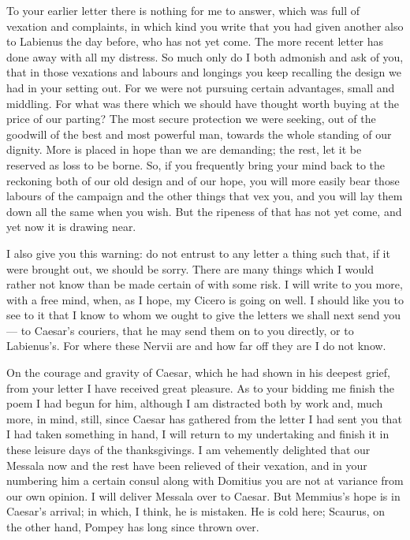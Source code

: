 

 To your earlier letter there is nothing for me to answer, which was full of vexation and complaints, in which kind you write that you had given another also to Labienus the day before, who has not yet come. The more recent letter has done away with all my distress. So much only do I both admonish and ask of you, that in those vexations and labours and longings you keep recalling the design we had in your setting out. For we were not pursuing certain advantages, small and middling. For what was there which we should have thought worth buying at the price of our parting? The most secure protection we were seeking, out of the goodwill of the best and most powerful man, towards the whole standing of our dignity. More is placed in hope than we are demanding; the rest, let it be reserved as loss to be borne. So, if you frequently bring your mind back to the reckoning both of our old design and of our hope, you will more easily bear those labours of the campaign and the other things that vex you, and you will lay them down all the same when you wish. But the ripeness of that has not yet come, and yet now it is drawing near.

 I also give you this warning: do not entrust to any letter a thing such that, if it were brought out, we should be sorry. There are many things which I would rather not know than be made certain of with some risk. I will write to you more, with a free mind, when, as I hope, my Cicero is going on well. I should like you to see to it that I know to whom we ought to give the letters we shall next send you --- to Caesar's couriers, that he may send them on to you directly, or to Labienus's. For where these Nervii are and how far off they are I do not know.

 On the courage and gravity of Caesar, which he had shown in his deepest grief, from your letter I have received great pleasure. As to your bidding me finish the poem I had begun for him, although I am distracted both by work and, much more, in mind, still, since Caesar has gathered from the letter I had sent you that I had taken something in hand, I will return to my undertaking and finish it in these leisure days of the thanksgivings. I am vehemently delighted that our Messala now and the rest have been relieved of their vexation, and in your numbering him a certain consul along with Domitius you are not at variance from our own opinion. I will deliver Messala over to Caesar. But Memmius's hope is in Caesar's arrival; in which, I think, he is mistaken. He is cold here; Scaurus, on the other hand, Pompey has long since thrown over.

